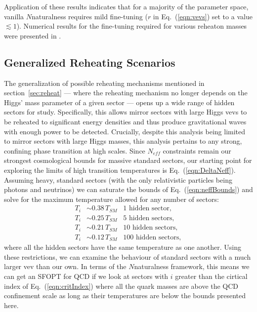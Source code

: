 \documentclass[nofootinbib,twocolumn,preprintnumbers]{revtex4-1}
\begin{document}
Application of these results indicates that for a majority of the parameter space, vanilla $N$naturalness requires mild fine-tuning ($r$ in Eq.~(\ref{eqn:vevs}) set to a value $\lesssim 1$). Numerical results for the fine-tuning required for various reheaton masses were presented in \cite{Arkani-Hamed:2016rle}. 



\subsection{Generalized Reheating Scenarios}

The generalization of possible reheating mechanisms mentioned in section~\ref{sec:reheat} --- where the reheating mechanism no longer depends on the Higgs' mass parameter of a given sector --- opens up a wide range of hidden sectors for study. Specifically, this allows mirror sectors with large Higgs vevs to be reheated to significant energy densities and thus produce gravitational waves with enough power to be detected. Crucially, despite this analysis being limited to mirror sectors with large Higgs masses, this analysis pertains to any strong, confining phase transition at high scales.
Since $N_{eff}$ constraints remain our strongest cosmological bounds for massive standard sectors, our starting point for exploring the limits of high transition temperatures is Eq.~(\ref{eqn:DeltaNeff}). Assuming heavy, standard sectors (with the only relativistic particles being photons and neutrinos) we can saturate the bounds of Eq.~(\ref{eqn:neffBounds}) and solve for the maximum temperature allowed for any number of sectors:
\begin{equation}\label{eqn:energyDensityAllowed}
\begin{split}
T_i &\sim 0.38 \,T_{SM} \,\,\,\,\, \mathrm{1}\,\, \mathrm{hidden}\,\, \mathrm{sector},
\\
T_i &\sim 0.25 \,T_{SM} \,\,\,\,\, \mathrm{5} \,\,\mathrm{hidden}\,\, \mathrm{sectors},
\\
T_i &\sim 0.21 \,T_{SM} \,\,\,\,\, \mathrm{10} \,\,\mathrm{hidden}\,\, \mathrm{sectors},
\\
T_i &\sim 0.12 \,T_{SM} \,\,\,\,\, \mathrm{100} \,\,\mathrm{hidden}\,\, \mathrm{sectors},
\end{split}
\end{equation}
where all the hidden sectors have the same temperature as one another.
Using these restrictions, we can examine the behaviour of standard sectors with a much larger vev than our own. In terms of the $N$naturalness framework, this means we can get an SFOPT for QCD if we look at sectors with $i$ greater than the cirtical index of Eq.~(\ref{eqn:critIndex}) where all the quark masses are above the QCD confinement scale as long as their temperatures are below the bounds presented here. 
\end{document}
